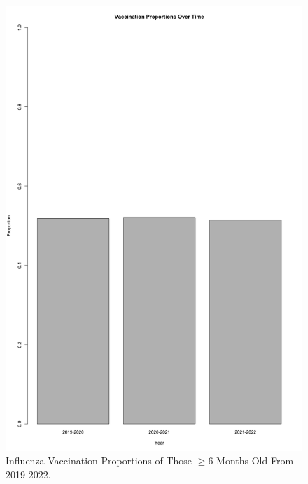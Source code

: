\documentclass[12pt]{article}
\begin{document}
\begin{figure}[ht!]
  \centering
  \includegraphics[width= 125mm ,scale=.75]{plot.png}
  \caption{Influenza Vaccination Proportions of Those $\ge 6$ Months Old From 2019-2022.}
  \label{fig:years}
\end{figure}
\end{document}

